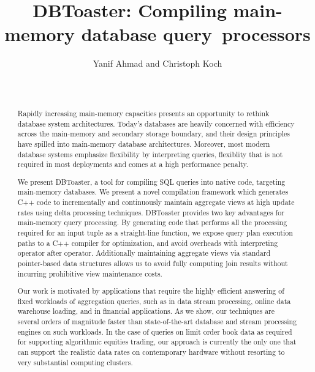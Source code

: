 \documentclass{vldb}
\title{DBToaster: Compiling main-memory database query~processors}
\author{
\alignauthor Yanif Ahmad and Christoph Koch \\
\affaddr{Department of Computer Science} \\
\affaddr{Cornell University, Ithaca, NY} \\
\email{\{yanif, koch\}@cs.cornell.edu}}
\date{}
\begin{document}
\maketitle


\begin{abstract}
Rapidly increasing main-memory capacities presents an opportunity to rethink
database system architectures. Today's databases are heavily concerned with
efficiency across the main-memory and secondary storage boundary, and their
design principles have spilled into main-memory database architectures. Moreover,
most modern database systems emphasize flexibility by interpreting queries,
flexiblity that is not required in most deployments and comes at a high
performance penalty.

We present DBToaster, a tool for compiling SQL queries into native code,
targeting main-memory databases. We present a novel compilation framework which
generates C++ code to incrementally and continuously maintain aggregate views at
high update rates using delta processing techniques. DBToaster provides two key
advantages for main-memory query processing. By generating code that performs all
the processing required for an input tuple as a straight-line function, we expose
query plan execution paths to a C++ compiler for optimization, and avoid
overheads with interpreting operator after operator. Additionally maintaining
aggregate views via standard pointer-based data structures allows us to avoid
fully computing join results without incurring prohibitive view maintenance
costs.

Our work is motivated by applications that require the highly efficient answering
of fixed workloads of aggregation queries, such as in data stream processing,
online data warehouse loading, and in financial applications. As we show, our
techniques are several orders of magnitude faster than state-of-the-art database
and stream processing engines on such workloads. In the case of queries on limit
order book data as required for supporting algorithmic equities trading, our
approach is currently the only one that can support the realistic data rates on
contemporary hardware without resorting to very substantial computing clusters.
\end{abstract}










\footnotesize{


}
\end{document}
